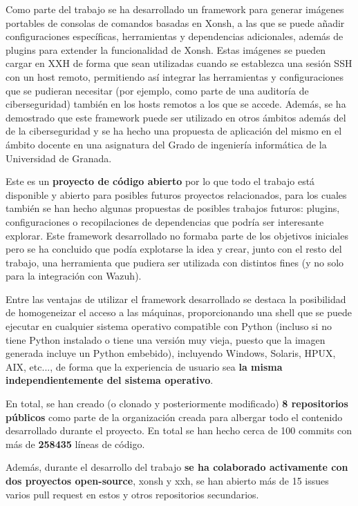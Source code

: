 Como parte del trabajo se ha desarrollado un framework para generar imágenes portables de consolas de comandos basadas en Xonsh, a las que se puede añadir configuraciones específicas, herramientas y dependencias adicionales, además de plugins para extender la funcionalidad de Xonsh. Estas imágenes se pueden cargar en XXH de forma que sean utilizadas cuando se establezca una sesión SSH con un host remoto, permitiendo así integrar las herramientas y configuraciones que se pudieran necesitar (por ejemplo, como parte de una auditoría de ciberseguridad) también en los hosts remotos a los que se accede. Además, se ha demostrado que este framework puede ser utilizado en otros ámbitos además del de la ciberseguridad y se ha hecho una propuesta de aplicación del mismo en el ámbito docente en una asignatura del Grado de ingeniería informática de la Universidad de Granada.

Este es un \textbf{proyecto de código abierto} por lo que todo el trabajo está disponible y abierto para posibles futuros proyectos relacionados, para los cuales también se han hecho algunas propuestas de posibles trabajos futuros: plugins, configuraciones o recopilaciones de dependencias que podría ser interesante explorar. Este framework desarrollado no formaba parte de los objetivos iniciales pero se ha concluido que podía explotarse la idea y crear, junto con el resto del trabajo, una herramienta que pudiera ser utilizada con distintos fines (y no solo para la integración con Wazuh). 

Entre las ventajas de utilizar el framework desarrollado se destaca la posibilidad de homogeneizar el acceso a las máquinas, proporcionando una shell que se puede ejecutar en cualquier sistema operativo compatible con Python (incluso si no tiene Python instalado o tiene una versión muy vieja, puesto que la imagen generada incluye un Python embebido), incluyendo Windows, Solaris, HPUX, AIX, etc..., de forma que la experiencia de usuario sea \textbf{la misma independientemente del sistema operativo}.

En total, se han creado (o clonado y posteriormente modificado) \textbf{8 repositorios públicos} como parte de la organización creada para albergar todo el contenido desarrollado durante el proyecto. En total se han hecho cerca de 100 commits con más de \textbf{258435} líneas de código. 

Además, durante el desarrollo del trabajo \textbf{se ha colaborado activamente con dos proyectos open-source}, xonsh y xxh, se han abierto más de 15 issues varios pull request en estos y otros repositorios secundarios.

